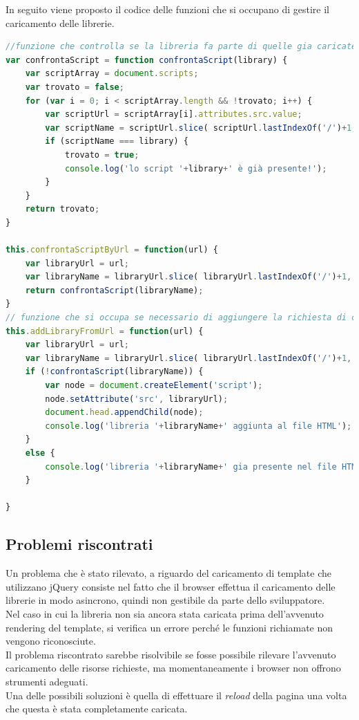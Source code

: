 In seguito viene proposto il codice delle funzioni che si occupano di gestire il caricamento delle librerie.
\begin{lstlisting}[language=JavaScript, caption=Funzioni che si occupano del caricamento delle librerie]
//funzione che controlla se la libreria fa parte di quelle gia caricate
var confrontaScript = function confrontaScript(library) {
	var scriptArray = document.scripts;
	var trovato = false;
	for (var i = 0; i < scriptArray.length && !trovato; i++) {
		var scriptUrl = scriptArray[i].attributes.src.value;
		var scriptName = scriptUrl.slice( scriptUrl.lastIndexOf('/')+1, scriptUrl.length);
		if (scriptName === library) {
			trovato = true;
			console.log('lo script '+library+' è già presente!');
		}
	}
	return trovato;
}

this.confrontaScriptByUrl = function(url) {
	var libraryUrl = url;
	var libraryName = libraryUrl.slice( libraryUrl.lastIndexOf('/')+1, libraryUrl.length );
	return confrontaScript(libraryName);
}
// funzione che si occupa se necessario di aggiungere la richiesta di caricamento alla pagina
this.addLibraryFromUrl = function(url) {
	var libraryUrl = url;
	var libraryName = libraryUrl.slice( libraryUrl.lastIndexOf('/')+1, libraryUrl.length );
	if (!confrontaScript(libraryName)) {
		var node = document.createElement('script');
		node.setAttribute('src', libraryUrl);
		document.head.appendChild(node);
		console.log('libreria '+libraryName+' aggiunta al file HTML');
	}
	else {
		console.log('libreria '+libraryName+' gia presente nel file HTML');
	}

}
\end{lstlisting}

\subsection{Problemi riscontrati}
Un problema che è stato rilevato, a riguardo del caricamento di template che utilizzano jQuery consiste nel fatto che il browser effettua il caricamento delle librerie in modo asincrono, quindi non gestibile da parte dello sviluppatore.\\
Nel caso in cui la libreria non sia ancora stata caricata prima dell'avvenuto rendering del template, si verifica un errore perché le funzioni richiamate non vengono riconosciute.\\
Il problema riscontrato sarebbe risolvibile se fosse possibile rilevare l'avvenuto caricamento delle risorse richieste, ma momentaneamente i browser non offrono strumenti adeguati.\\
Una delle possibili soluzioni è quella di effettuare il \textit{reload} della pagina una volta che questa è stata completamente caricata.




